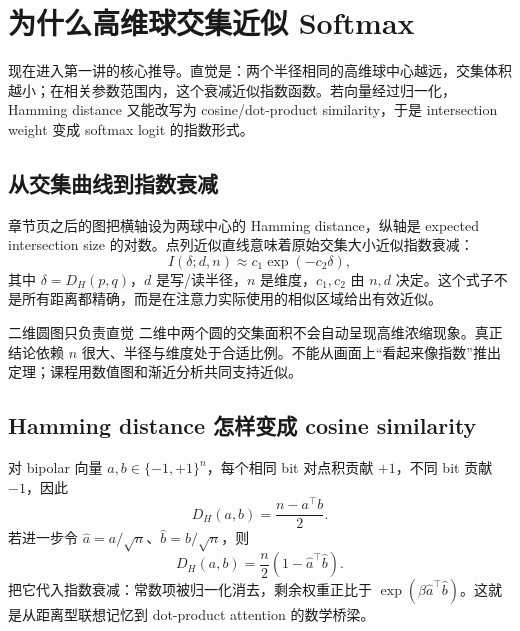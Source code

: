\section{为什么高维球交集近似 Softmax}

现在进入第一讲的核心推导。直觉是：两个半径相同的高维球中心越远，交集体积越小；在相关参数范围内，这个衰减近似指数函数。若向量经过归一化，Hamming distance 又能改写为 cosine/dot-product similarity，于是 intersection weight 变成 softmax logit 的指数形式。

\subsection{从交集曲线到指数衰减}

章节页之后的图把横轴设为两球中心的 Hamming distance，纵轴是 expected intersection size 的对数。点列近似直线意味着原始交集大小近似指数衰减：
$$
I(\delta;d,n)\approx c_1\exp(-c_2\delta),
$$
其中 $\delta=D_H(p,q)$，$d$ 是写/读半径，$n$ 是维度，$c_1,c_2$ 由 $n,d$ 决定。这个式子不是所有距离都精确，而是在注意力实际使用的相似区域给出有效近似。



\begin{warningbox}{二维圆图只负责直觉}
二维中两个圆的交集面积不会自动呈现高维浓缩现象。真正结论依赖 $n$ 很大、半径与维度处于合适比例。不能从画面上“看起来像指数”推出定理；课程用数值图和渐近分析共同支持近似。
\end{warningbox}

\subsection{Hamming distance 怎样变成 cosine similarity}

对 bipolar 向量 $a,b\in\{-1,+1\}^{n}$，每个相同 bit 对点积贡献 $+1$，不同 bit 贡献 $-1$，因此
$$
D_H(a,b)=\frac{n-a^{\top}b}{2}.
$$
若进一步令 $\hat a=a/\sqrt n$、$\hat b=b/\sqrt n$，则
$$
D_H(a,b)=\frac{n}{2}\left(1-\hat a^{\top}\hat b\right).
$$
把它代入指数衰减：常数项被归一化消去，剩余权重正比于 $\exp(\beta\hat a^{\top}\hat b)$。这就是从距离型联想记忆到 dot-product attention 的数学桥梁。


